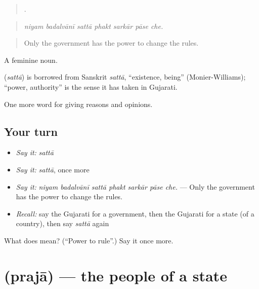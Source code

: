 \begin{quote}
      .
\end{quote}

\begin{quote}
\emph{niyam badalvānī sattā phakt sarkār pāse che.}
\end{quote}

\begin{quote}
Only the government has the power to change the rules.
\end{quote}

A feminine noun.

\begin{cousinweb}
\textbf{} (\emph{sattā}) is borrowed from Sanskrit \emph{sattā}, \textquotedblleft{}existence, being\textquotedblright{} (Monier-Williams); \textquotedblleft{}power, authority\textquotedblright{} is the sense it has taken in Gujarati.
\end{cousinweb}

\begin{grammarlens}[title={What you've built}]
One more word for giving reasons and opinions.
\end{grammarlens}

\subsection*{Your turn}
\begin{itemize}
\raggedright
  \item \emph{Say it:} \emph{sattā}
  \item \emph{Say it:} \emph{sattā}, once more
  \item \emph{Say it:} \emph{niyam badalvānī sattā phakt sarkār pāse che.} — Only the government has the power to change the rules.
  \item \emph{Recall:} say the Gujarati for a government, then the Gujarati for a state (of a country), then say \emph{sattā} again
\end{itemize}

\begin{tcolorbox}[breakable,colback=teal!4,colframe=teal!35!black,title={Before you move on}]
What does  mean? (\textquotedblleft{}Power to rule\textquotedblright{}.) Say it once more.
\end{tcolorbox}
\section[\texorpdfstring{\gu{પ્રજા} (prajā)}{પ્રજા (prajā)}]{ (prajā) — the people of a state}

